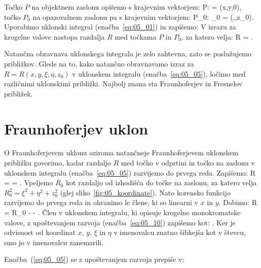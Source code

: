 Točko $P$ na objektnem zaslonu opišemo s krajevnim vektorjem:
\beq
P:  = (x,y,0),
\label{eq:05_03}
\eeq
točko $P_0$ na opazovalnem zaslonu pa s krajevnim vektorjem:
\beq
P_0: _0 = (\xi,\eta,z_0).
\label{eq:05_04}
\eeq
Uporabimo uklonski integral (enačba~\ref{eq:05_01}) in zapišemo:
V izrazu za krogelne valove nastopa razdalja $R$ med točkama $P$ in $P_0$, za
katero velja:
\beq
R = .
\label{eq:05_06}
\eeq

Natančna obravnava uklonskega integrala je zelo zahtevna, zato se poslužujemo približkov.
Glede na to, kako natančno obravnavamo izraz za $R = R(x,y,\xi, \eta, z_0)$ v uklonskem
integralu (enačba~\ref{eq:05_05}), ločimo med različnimi uklonskimi približki. Najbolj 
znana sta Fraunhoferjev in Fresnelov približek.

\section{Fraunhoferjev uklon}
O Fraunhoferjevem uklonu oziroma natančneje Fraunhoferjevem uklonskem približku govorimo,
kadar razdaljo $R$ med točko v odprtini in točko na zaslonu v uklonskem integralu 
(enačba~\ref{eq:05_05}) razvijemo do prvega reda. Zapišemo:
\beq
R =  =
.
\label{eq:05_07}
\eeq
Vpeljemo $R_0$ kot razdaljo od izhodišča do točke na zaslonu, za katero velja 
$R_0^2 = \xi^2 + \eta^2 + z_0^2$ (glej sliko~\ref{fig:05_koordinate}). Nato korensko
funkcijo razvijemo do prvega reda in ohranimo le člene, ki so linearni v $x$ in $y$. 
Dobimo:
\beq
R =  \approx 
R_0 -  - .
\label{eq:05_10}
\eeq
Člen v uklonskem integralu, ki opisuje krogelne monokromatske valove, z upoštevanjem razvoja
(enačba~\ref{eq:05_10}) zapišemo kot:
\beq
{} \approx {}.
\label{eq:05_11}
\eeq
Ker je odvisnost od koordinat $x$, $y$, $\xi$ in $\eta$ v imenovalcu znatno 
šibkejša kot v števcu, smo jo v imenovalcu zanemarili. 

Enačba~(\ref{eq:05_05}) se z upoštevanjem razvoja prepiše v:

